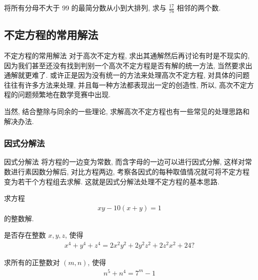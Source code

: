 \documentclass[aspectratio=169]{ctexbeamer}
\theoremstyle{definition}
\begin{document}
\begin{frame}[t]
	\begin{example}
		将所有分母不大于 99 的最简分数从小到大排列, 求与 $\frac{17}{76}$ 相邻的两个数.
	\end{example}
\end{frame}

\subsection{不定方程的常用解法}
\begin{frame}{不定方程的常用解法}
	对于高次不定方程, 求出其通解然后再讨论有时是不现实的, 因为我们甚至还没有找到判别一个高次不定方程是否有解的统一方法, 当然要求出通解就更难了. 或许正是因为没有统一的方法来处理高次不定方程, 对具体的问题往往有许多方法来处理, 并且每一种方法都表现出一定的创造性, 所以, 高次不定方程的问题频繁地在数学竞赛中出现.

	当然, 结合整除与同余的一些理论, 求解高次不定方程也有一些常见的处理思路和解决办法.
\end{frame}


\subsubsection*{因式分解法}
\setcounter{theorem}{0}
\begin{frame}{因式分解法}
将方程的一边变为常数, 而含字母的一边可以进行因式分解, 这样对常数进行素因数分解后, 对比方程两边, 考察各因式的每种取值情况就可将不定方程变为若干个方程组去求解. 这就是因式分解法处理不定方程的基本思路.
\end{frame}
\begin{frame}[t]
	\begin{example}
		求方程
		\begin{align*}
			x y-10(x+y)=1
		\end{align*}
		的整数解.
	\end{example}
\end{frame}

\begin{frame}[t]
	\begin{example}
		是否存在整数 $x ,  y ,  z$, 使得
		\begin{align*}
			x^{4}+y^{4}+z^{4}=2 x^{2} y^{2}+2 y^{2} z^{2}+2 z^{2} x^{2}+24 ?
		\end{align*}
	\end{example}
\end{frame}

\begin{frame}[t]
	\begin{example}
		求所有的正整数对 $(m, n)$, 使得
		\begin{align*}
			n^{5}+n^{4}=7^{m}-1
		\end{align*}
	\end{example}
\end{frame}
\end{document}
